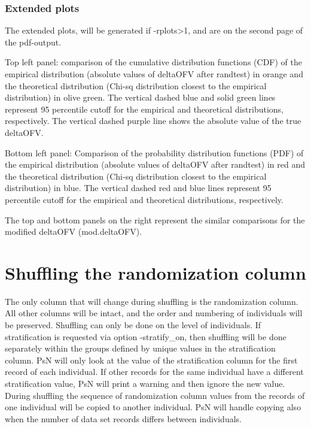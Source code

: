 \subsubsection*{Extended plots}
The extended plots, will be generated if -rplots>1, and are on the
second page of the pdf-output.

Top left panel: comparison of the cumulative distribution functions (CDF) 
of the empirical distribution (absolute values of deltaOFV after randtest) in 
orange and the theoretical distribution (Chi-sq distribution closest to the 
empirical distribution) in olive green. The vertical dashed blue and solid 
green lines represent 95 percentile cutoff for the empirical and theoretical 
distributions, respectively. The vertical dashed purple line shows the absolute
value of the true deltaOFV.

Bottom left panel: Comparison of the probability distribution functions (PDF) 
of the empirical distribution (absolute values of deltaOFV after randtest) in 
red and the theoretical distribution (Chi-sq distribution closest to the 
empirical distribution) in blue. The vertical dashed red and blue lines 
represent 95 percentile cutoff for the empirical and theoretical distributions,
respectively.

The top and bottom panels on the right represent the similar comparisons for 
the modified deltaOFV (mod.deltaOFV).

\section{Shuffling the randomization column}

The only column that will change during shuffling is the randomization column. All other columns will be intact, and the order and numbering of individuals will be preserved. Shuffling can only be done on the level of individuals. If stratification is requested via option -stratify\_on, then shuffling will be done separately within the groups defined by unique values in the stratification column. PsN will only look at the value of the stratification column for the first record of each individual. If other records for the same individual have a different stratification value, PsN will print a warning and then ignore the new value.
During shuffling the sequence of randomization column values from the records of one individual will be copied to another individual. PsN will handle copying also when the number of data set records differs between individuals.

